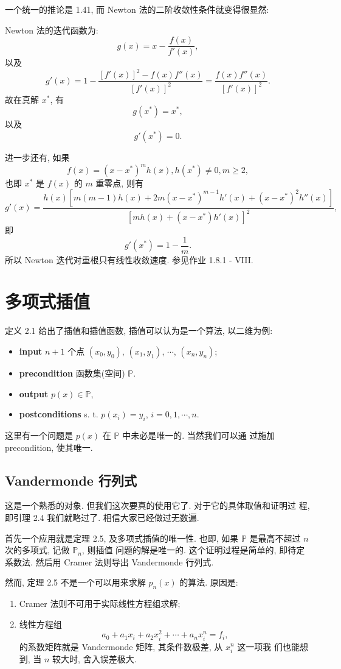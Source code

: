\documentclass[a4paper]{ctexart}
\newcommand{\remark}[1]
{\noindent {\bf Remark {#1}}}
\begin{document}
一个统一的推论是 1.41, 而 Newton 法的二阶收敛性条件就变得很显然:

Newton 法的迭代函数为:
$$
g(x) = x - \frac{f(x)}{f'(x)},
$$
以及
$$
g'(x) = 1 - \frac{\left[f'(x)\right]^2 - f(x)f''(x)}{\left[f'(x)\right]^2}
= \frac{f(x)f''(x)}{\left[f'(x)\right]^2}.
$$
故在真解 $x^*$, 有
$$
g(x^*) = x^*, 
$$
以及
$$
g'(x^*) = 0.
$$

进一步还有, 如果
$$
f(x) = (x - x^*)^m h(x), h(x^*) \neq 0, m \geq 2,
$$
也即 $x^*$ 是 $f(x)$ 的 $m$ 重零点, 则有
$$
g'(x) = \frac{h(x)\left[m(m - 1)h(x) + 2m(x - x^*)^{m - 1}h'(x)
    + (x - x^*)^2h''(x)\right]}{\left[mh(x) + (x - x^*)h'(x)\right]^2},
$$
即
$$
g'(x^*) = 1 - \frac{1}{m}.
$$
所以 Newton 迭代对重根只有线性收敛速度. 参见作业 1.8.1 - VIII.

\section{多项式插值}

\remark{2.1} 定义 2.1 给出了插值和插值函数, 插值可以认为是一个算法, 以二维为例:
\begin{itemize}
\item {\bf input} $n + 1$ 个点 $(x_0, y_0)$, $(x_1, y_1)$, $\cdots$, $(x_n, y_n)$;
\item {\bf precondition} 函数集(空间) $\mathbb{P}$.
\item {\bf output} $p(x) \in \mathbb{P}$,
\item {\bf postconditions}  s. t. $p(x_i) = y_i$, $i = 0, 1, \cdots, n$.
\end{itemize}
这里有一个问题是 $p(x)$ 在 $\mathbb{P}$ 中未必是唯一的. 当然我们可以通
过施加 precondition, 使其唯一. 


\subsection{Vandermonde 行列式}

这是一个熟悉的对象. 但我们这次要真的使用它了. 对于它的具体取值和证明过
程, 即引理 2.4 我们就略过了. 相信大家已经做过无数遍.

首先一个应用就是定理 2.5, 及多项式插值的唯一性. 也即, 如果
$\mathbb{P}$ 是最高不超过 $n$ 次的多项式, 记做 $\mathbb{P}_n$, 则插值
问题的解是唯一的. 这个证明过程是简单的, 即待定系数法. 然后用 Cramer 法则导出
Vandermonde 行列式.

然而, 定理 2.5 不是一个可以用来求解 $p_n(x)$ 的算法. 原因是:
\begin{enumerate}
\item Cramer 法则不可用于实际线性方程组求解;
\item 线性方程组
  $$
  a_0 + a_1 x_i + a_2 x_i^2 + \cdots + a_n x_i^n = f_i,
  $$
  的系数矩阵就是 Vandermonde 矩阵, 其条件数极差, 从 $x_i^n$ 这一项我
  们也能想到, 当 $n$ 较大时, 舍入误差极大. 
\end{enumerate}
\end{document}
